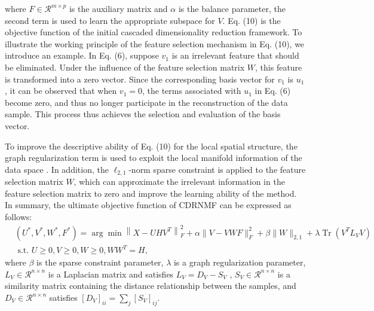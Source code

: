 \documentclass[a4paper,fleqn]{cas-sc}
\begin{document}
where $F \in \mathcal{R}^{m \times p}$ is the auxiliary matrix and $\alpha$ is the balance parameter, the second term is used to learn the appropriate subspace for $V$. Eq. (10)  is the objective function of the initial cascaded dimensionality reduction framework. To illustrate the working principle of the feature selection mechanism in Eq. (10), we introduce an example. In Eq. (6), suppose \( v_1 \) is an irrelevant feature that should be eliminated. Under the influence of the feature selection matrix \( W \), this feature is transformed into a zero vector. Since the corresponding basis vector for \( v_1 \) is \( u_1 \), it can be observed that when \( v_1 = 0 \), the terms associated with \( u_1 \) in Eq. (6) become zero, and thus no longer participate in the reconstruction of the data sample. This process thus achieves the selection and evaluation of the basis vector.

To improve the descriptive ability of Eq. (10) for the local spatial structure, the graph regularization term is used to exploit the local manifold information of the data space \cite{19}. In addition, the $\ell_{2,1}$-norm sparse constraint is applied to the feature selection matrix $W$, which can approximate the irrelevant information in the feature selection matrix to zero and improve the learning ability of the method. In summary, the ultimate objective function of CDRNMF can be expressed as follows:
\begin{equation}
	\begin{aligned}
		& \left(U^*, V^*, W^*, F^*\right)=\arg \min \left\|X-U H V^T\right\|_F^2+\alpha\|V-V W F\|_F^2+\beta\|W\|_{2,1}+\lambda \operatorname{Tr}\left(V^T L_V V\right)\\
		& \text { s.t. } U \geq 0, V \geq 0, W \geq 0, W W^T=H,
	\end{aligned}
\end{equation}
where $\beta$ is the sparse constraint parameter, $\lambda$ is a graph regularization parameter, $L_V \in \mathcal{R}^{n \times n}$ is a Laplacian matrix and satisfies $L_V=D_V-S_V$ \cite{23}, $S_V \in \mathcal{R}^{n \times n}$ is a similarity matrix containing the distance relationship between the samples, and $D_V \in \mathcal{R}^{n \times n}$ satisfies $\left[D_V\right]_{i i}=\sum_j\left[S_V\right]_{i j}$.
\end{document}
